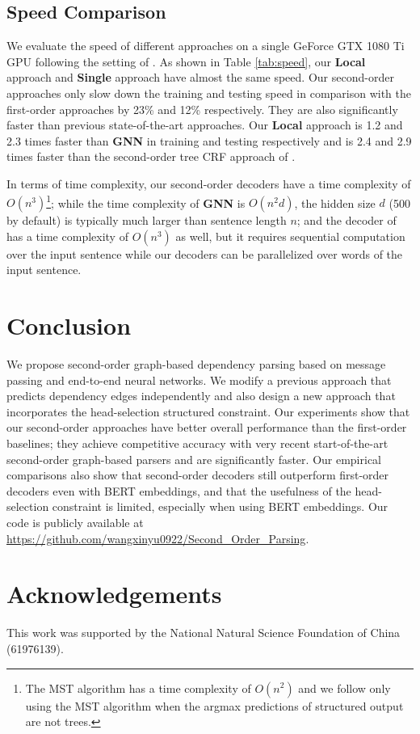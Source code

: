 \documentclass[11pt,a4paper]{article}
\begin{document}
\subsection{Speed Comparison}
We evaluate the speed of different approaches on a single GeForce GTX 1080 Ti GPU following the setting of \citet{zhang2020efficient}. As shown in Table \ref{tab:speed}, our \textbf{Local} approach and \textbf{Single} approach have almost the same speed. Our second-order approaches only slow down the training and testing speed in comparison with the first-order approaches by 23\% and 12\% respectively. They are also significantly faster than previous state-of-the-art approaches. Our \textbf{Local} approach is 1.2 and 2.3 times faster than \textbf{GNN} in training and testing respectively and is 2.4 and 2.9 times faster than the second-order tree CRF approach of \citet{zhang2020efficient}. 

In terms of time complexity, our second-order decoders have a time complexity of $O(n^3)$\footnote{The MST algorithm has a time complexity of $O(n^2)$ and we follow \citet{dozat-etal-2017-stanfords} only using the MST algorithm when the argmax predictions of structured output are not trees.}; while the time complexity of \textbf{GNN} is $O(n^2d)$, the hidden size $d$ (500 by default) is typically much larger than sentence length $n$; and the decoder of \citet{zhang2020efficient} has a time complexity of $O(n^3)$ as well, but it requires sequential computation over the input sentence while our decoders can be parallelized over words of the input sentence. 


\section{Conclusion}
We propose second-order graph-based dependency parsing based on message passing and end-to-end neural networks. We modify a previous approach that predicts dependency edges independently and also design a new approach that incorporates the head-selection structured constraint. Our experiments show that our second-order approaches have better overall performance than the first-order baselines; they achieve competitive accuracy with very recent start-of-the-art second-order graph-based parsers and are significantly faster. Our empirical comparisons also show that second-order decoders still outperform first-order decoders even with BERT embeddings, and that the usefulness of the head-selection constraint is limited, especially when using BERT embeddings. Our code is publicly available at \url{https://github.com/wangxinyu0922/Second_Order_Parsing}.

\section*{Acknowledgements}
This work was supported by the National Natural Science Foundation of China (61976139).




\end{document}
